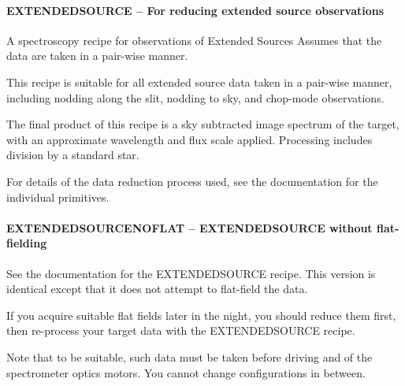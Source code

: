 \documentclass[twoside,11pt]{article}
\renewcommand{\_}{\texttt{\symbol{95}}}
\begin{document}
\paragraph*{EXTENDED\_SOURCE -- For reducing extended source observations\label{EXTENDED_SOURCE_--_For_reducing_extended_source_observations}}



\mbox{}

A spectroscopy recipe for observations of Extended Sources
Assumes that the data are taken in a pair-wise manner.



This recipe is suitable for all extended source data taken in a pair-wise
manner, including nodding along the slit, nodding to sky, and
chop-mode observations.



The final product of this recipe is a sky subtracted image spectrum of
the target, with an approximate wavelength and flux scale
applied. Processing includes division by a standard star.



For details of the data reduction process used, see the documentation
for the individual primitives.


\paragraph*{EXTENDED\_SOURCE\_NOFLAT -- EXTENDED\_SOURCE without flat-fielding\label{EXTENDED_SOURCE_NOFLAT_--_EXTENDED_SOURCE_without_flat-fielding}}



\mbox{}

See the documentation for the EXTENDED\_SOURCE recipe. This version is
identical except that it does not attempt to flat-field the data.



If you acquire suitable flat fields later in the night, you should
reduce them first, then re-process your target data with the
EXTENDED\_SOURCE recipe.



Note that to be suitable, such data must be taken before driving and
of the spectrometer optics motors. You cannot change configurations
in between.
\end{document}
